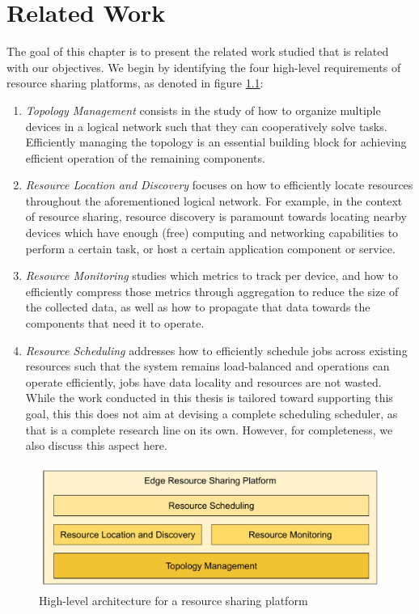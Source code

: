 \chapter{Related Work} 
\label{cha:related_work}

The goal of this chapter is to present the related work studied that is related with our objectives. We begin by identifying the four high-level requirements of resource sharing platforms, as denoted in figure \ref{fig:proposed_architecture}:

\begin{enumerate}

    \item \textit{Topology Management} consists in the study of how to organize multiple devices in a logical network such that they can cooperatively solve tasks. Efficiently managing the topology is an essential building block for achieving efficient operation of the remaining components. 
    
    \item \textit{Resource Location and Discovery} focuses on how to efficiently locate resources throughout the aforementioned logical network. For example, in the context of resource sharing, resource discovery is paramount towards locating nearby devices which have enough (free) computing and networking capabilities to perform a certain task, or host a certain application component or service.
    
    \item \textit{Resource Monitoring} studies which metrics to track per device, and how to efficiently compress those metrics through aggregation to reduce the size of the collected data, as well as how to propagate that data towards the components that need it to operate.

    \item \textit{Resource Scheduling} addresses how to efficiently schedule jobs across existing resources such that the system remains load-balanced and operations can operate efficiently, jobs have data locality and resources are not wasted. While the work conducted in this thesis is tailored toward supporting this goal, this this does not aim at devising a complete scheduling scheduler, as that is a complete research line on its own. However, for completeness, we also discuss this aspect here.

\end{enumerate}

\begin{figure}
    \centering
    \includegraphics[width=0.8\linewidth]{Figures/proposed_architecture.pdf}
    \caption{High-level architecture for a resource sharing platform}
    \label{fig:proposed_architecture}
\end{figure}

